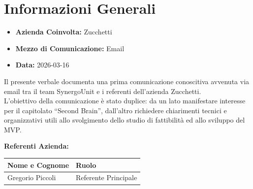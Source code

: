 \section{Informazioni Generali}
\begin{itemize}
	\item \textbf{Azienda Coinvolta:} {Zucchetti}
	\item \textbf{Mezzo di Comunicazione:} {Email}
	\item \textbf{Data:} 2026-03-16
\end{itemize}

Il presente verbale documenta una prima comunicazione conoscitiva avvenuta via email tra il team SynergoUnit e i referenti dell’azienda Zucchetti. \\
L’obiettivo della comunicazione è stato duplice: da un lato manifestare interesse per il capitolato “Second Brain”, dall’altro richiedere chiarimenti tecnici e organizzativi utili allo svolgimento dello studio di fattibilità ed allo sviluppo del MVP.

\vspace{0.5cm}
\textbf{Referenti Azienda:}
\begin{table}[ht]
	\centering
	\renewcommand{\arraystretch}{1.2}
	\begin{tabularx}{\textwidth}{X l}
		\toprule
		\textbf{Nome e Cognome} & \textbf{Ruolo} \\
		\midrule
		{Gregorio Piccoli} & {Referente Principale} \\
		\bottomrule
	\end{tabularx}
\end{table}

